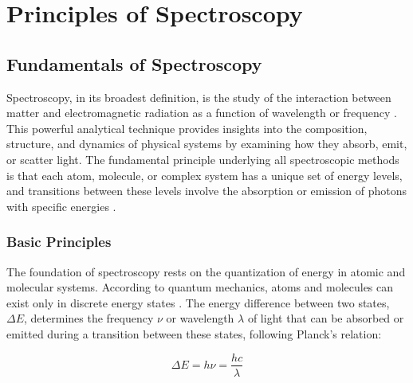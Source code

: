 \chapter{Principles of Spectroscopy} %

\label{chap:spectroscopy} %


\section{Fundamentals of Spectroscopy}
\label{sec:spectroscopy_fundamentals}

\noindent Spectroscopy, in its broadest definition, is the study of the interaction between matter and electromagnetic radiation as a function of wavelength or frequency \cite{mukamel1995principlesnonlinearoptical}.
This powerful analytical technique provides insights into the composition, structure, and dynamics of physical systems by examining how they absorb, emit, or scatter light. The fundamental principle underlying all spectroscopic methods is that each atom, molecule, or complex system has a unique set of energy levels, and transitions between these levels involve the absorption or emission of photons with specific energies \cite{boyd2008chapter1nonlinear}.

\subsection{Basic Principles}
\label{subsec:basic_principles}

\noindent The foundation of spectroscopy rests on the quantization of energy in atomic and molecular systems. According to quantum mechanics, atoms and molecules can exist only in discrete energy states \cite{albashetal2012quantumadiabaticmarkovian}. The energy difference between two states, $\Delta E$, determines the frequency $\nu$ or wavelength $\lambda$ of light that can be absorbed or emitted during a transition between these states, following Planck's relation:

\begin{equation}
	\Delta E = h\nu = \frac{hc}{\lambda}
	\label{eq:planck_relation}
\end{equation}

